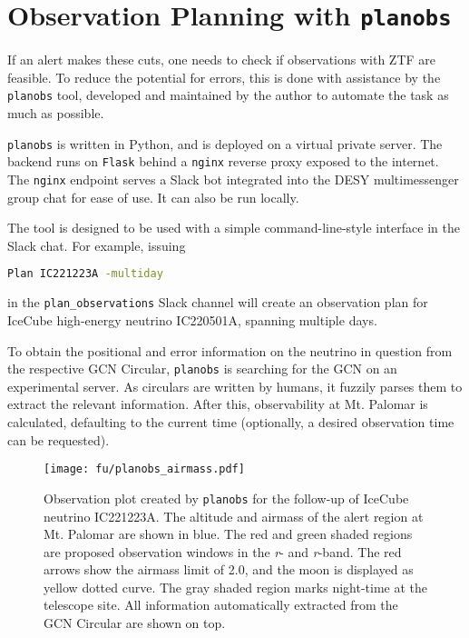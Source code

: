 \section{Observation Planning with \texttt{planobs}}\label{planobs}
If an alert makes these cuts, one needs to check if observations with ZTF are feasible. To reduce the potential for errors, this is done with assistance by the \texttt{planobs}  tool, developed and maintained by the author to automate the task as much as possible.

\texttt{planobs} is written in Python, and is deployed on a virtual private server. The backend runs on \texttt{Flask} behind a \texttt{nginx} reverse proxy exposed to the internet. The \texttt{nginx} endpoint serves a Slack bot integrated into the DESY multimessenger group chat for ease of use. It can also be run locally.

The tool is designed to be used with a simple command-line-style interface in the Slack chat. For example, issuing
\begin{lstlisting}[language=bash,style=kaolstplain]
Plan IC221223A -multiday
\end{lstlisting}
in the \texttt{plan\_observations} Slack channel will create an observation plan for IceCube high-energy neutrino IC220501A, spanning multiple days.

To obtain the positional and error information on the neutrino in question from the respective GCN Circular, \texttt{planobs} is searching for the GCN on an experimental server. As circulars are written by humans, it fuzzily parses them to extract the relevant information. After this, observability at Mt. Palomar is calculated, defaulting to the current time (optionally, a desired observation time can be requested). 

\begin{figure}[h!]
    \texttt{[image: fu/planobs\_airmass.pdf]}
    \caption[Observation plan]{Observation plot created by \texttt{planobs} for the follow-up of IceCube neutrino IC221223A. The altitude and airmass of the alert region at Mt. Palomar are shown in blue. The red and green shaded regions are proposed observation windows in the \textit{r}- and \textit{r}-band. The red arrows show the airmass limit of 2.0, and the moon is displayed as yellow dotted curve. The gray shaded region marks night-time at the telescope site. All information automatically extracted from the GCN Circular are shown on top.}
\end{figure}

